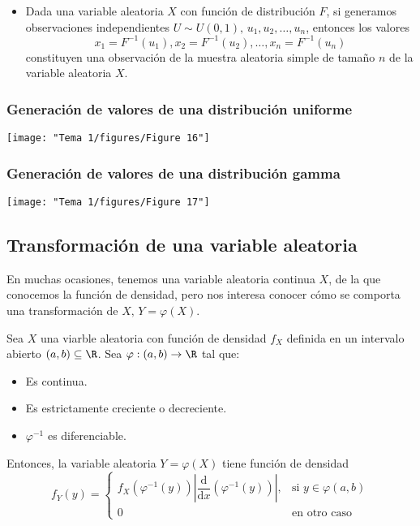 \begin{tcolorbox}[colback=blue!5!white, colframe=blue!75!black, title=\textbf{Método de la función inversa}]
\begin{itemize}[label=\textbullet]
    \item Dada una variable aleatoria $X$ con función de distribución $F$, si generamos observaciones independientes $U\sim U(0,1),\,u_1,u_2,\dots,u_n$, entonces los valores $$x_1=F^{-1}(u_1),x_2=F^{-1}(u_2),\dots,x_n=F^{-1}(u_n)$$ constituyen una observación de la muestra aleatoria simple de tamaño $n$ de la variable aleatoria $X$.
\end{itemize}
\end{tcolorbox}

\subsubsection*{Generación de valores de una distribución uniforme}
\begin{center}
    \texttt{[image: "Tema 1/figures/Figure 16"]}
\end{center}
\subsubsection*{Generación de valores de una distribución gamma}
\begin{center}
    \texttt{[image: "Tema 1/figures/Figure 17"]}
\end{center}
\subsection*{Transformación de una variable aleatoria}
\begin{tcolorbox}[colback=blue!5!white, colframe=blue!75!black, title=\textbf{Planteamiento del problema}]
En muchas ocasiones, tenemos una variable aleatoria continua $X$, de la que conocemos la función de densidad, pero nos interesa conocer cómo se comporta una transformación de $X,\,Y=\varphi(X)$.

\end{tcolorbox}
\begin{tcolorbox}[colback=blue!5!white, colframe=blue!75!black, title=\textbf{Teorema}]
Sea $X$ una viarble aleatoria con función de densidad $f_X$ definida en un intervalo abierto  $(a,b)\subseteq \R$. Sea $\varphi:(a,b)\to \R$ tal que:
\begin{itemize}[label=\textbullet]
    \item Es continua.
    \item Es estrictamente creciente o decreciente.
    \item $\varphi^{-1}$ es diferenciable.
\end{itemize}
Entonces, la variable aleatoria $Y=\varphi(X)$ tiene función de densidad \[
f_Y(y)=\begin{cases}
    f_X(\varphi^{-1}(y))\left| \dfrac{\mathrm{d}}{\mathrm{d}x}(\varphi^{-1}(y)) \right| , & \text{si }y\in \varphi(a,b)\\
    0 & \text{en otro caso}

\end{cases}
\] 
\end{tcolorbox}
